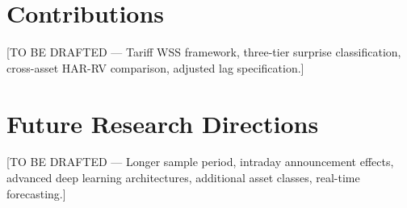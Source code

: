 \documentclass[12pt,a4paper]{report}
\begin{document}
\section{Contributions}
[TO BE DRAFTED --- Tariff WSS framework, three-tier surprise classification, cross-asset HAR-RV comparison, adjusted lag specification.]

\section{Future Research Directions}
[TO BE DRAFTED --- Longer sample period, intraday announcement effects, advanced deep learning architectures, additional asset classes, real-time forecasting.]



\end{document}
